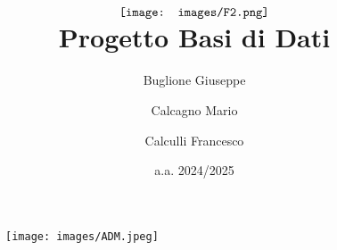 \documentclass[10pt]{report}
\title{$\vcenter{\hbox{\texttt{[image: images/F2.png]}}}$ \\ Progetto Basi di Dati}
\author{Buglione Giuseppe}
\author{Calcagno Mario}
\author{Calculli Francesco}
\affil{Dipartimento delle Tecnologie dell'Informazione, Università Federico II}
\date{a.a. 2024/2025}
\begin{document}
\begin{figure}[ht]
\centering
\texttt{[image: images/ADM.jpeg]}
\end{figure}

\maketitle

\tableofcontents






\end{document}
